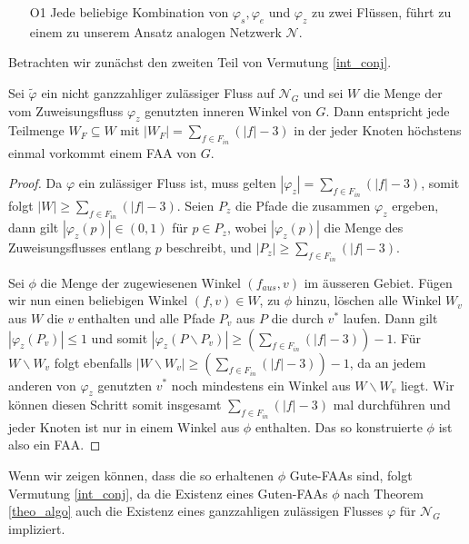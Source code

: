 \begin{itemize}
\item [O1] Jede beliebige Kombination von $\varphi_s,\varphi_e$ und $\varphi_z$ zu zwei Flüssen, führt zu einem zu unserem Ansatz analogen Netzwerk $\mathcal{N}$.
\end{itemize}

Betrachten wir zunächst den zweiten Teil von Vermutung \ref{int_conj}.

\begin{lemma}\label{lem_faa}
Sei $\tilde{\varphi}$ ein nicht ganzzahliger zulässiger Fluss auf $\mathcal{N}_G$ und sei $W$ die Menge der vom Zuweisungsfluss $\varphi_z$ genutzten inneren Winkel von $G$. Dann entspricht jede Teilmenge $W_{F}\subseteq W$ mit $|W_F| = \sum_{f \in F_{in}}(|f|-3)$ in der jeder Knoten höchstens einmal vorkommt einem FAA von $G$.
\end{lemma}

\begin{proof}
Da $\varphi$ ein zulässiger Fluss ist, muss gelten $|\varphi_z| = \sum_{f \in F_{in}}(|f|-3)$, somit folgt $|W| \geq \sum_{f \in F_{in}}(|f|-3)$. Seien $P_z$ die Pfade die zusammen $\varphi_z$ ergeben, dann gilt $|\varphi_z(p)| \in (0,1)$ für $p \in P_z$, wobei $|\varphi_z(p)|$ die Menge des Zuweisungsflusses entlang $p$ beschreibt, und $|P_z| \geq \sum_{f \in F_{in}}(|f|-3)$.

Sei $\phi$ die Menge der zugewiesenen Winkel $(f_{aus},v)$ im äusseren Gebiet. Fügen wir nun einen beliebigen Winkel $(f,v)\in W$, zu $\phi$ hinzu, löschen alle Winkel $W_v$ aus $W$ die $v$ enthalten und alle Pfade $P_v$ aus $P$ die durch $v^*$ laufen. Dann gilt $|\varphi_z(P_v)| \leq 1$ und somit $|\varphi_z(P\backslash P_v)| \geq (\sum_{f \in F_{in}}(|f|-3)) - 1$. Für $W \backslash W_v$ folgt ebenfalls $|W \backslash W_v| \geq (\sum_{f \in F_{in}}(|f|-3))- 1$, da an jedem anderen von $\varphi_z$ genutzten $v^*$ noch mindestens ein Winkel aus $W\backslash W_v$ liegt. Wir können diesen Schritt somit insgesamt $\sum_{f \in F_{in}}(|f|-3)$ mal durchführen und jeder Knoten ist nur in einem Winkel aus $\phi$ enthalten. Das so konstruierte $\phi$ ist also ein FAA.
\end{proof}

Wenn wir zeigen können, dass die so erhaltenen $\phi$ Gute-FAAs sind, folgt Vermutung \ref{int_conj}, da die Existenz eines Guten-FAAs $\phi$ nach Theorem \ref{theo_algo} auch die Existenz eines ganzzahligen zulässigen Flusses $\varphi$ für $\mathcal{N}_G$ impliziert.

